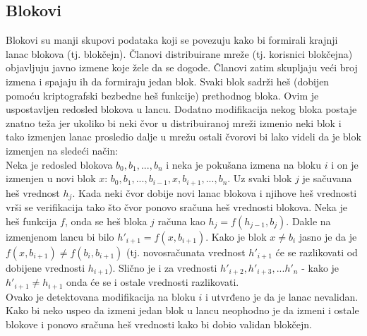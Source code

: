 \documentclass[a4paper]{article}
\begin{document}
{\subsection{Blokovi}
Blokovi su manji skupovi podataka koji se povezuju kako bi formirali krajnji lanac blokova (tj. blokčejn).
Članovi distribuirane mreže (tj. korisnici blokčejna) objavljuju javno izmene koje žele da se dogode.
Članovi zatim skupljaju veći broj izmena i spajaju ih da formiraju jedan blok.
Svaki blok sadrži heš (dobijen pomoću kriptografski bezbedne heš funkcije) prethodnog bloka.
Ovim je uspostavljen redosled blokova u lancu. Dodatno modifikacija nekog bloka postaje znatno teža jer ukoliko
bi neki čvor u distribuiranoj mreži izmenio neki blok i tako izmenjen lanac prosledio dalje u mrežu
ostali čvorovi bi lako videli da je blok izmenjen na sledeći način:\\
Neka je redosled blokova $b_0,b_1,...,b_n$ i neka je pokušana izmena na bloku $i$ i on je izmenjen u novi blok $x$:
$b_0,b_1,...,b_{i-1},x,b_{i+1},...,b_n$.
Uz svaki blok $j$ je sačuvana heš vrednost $h_j$. Kada neki čvor dobije novi lanac blokova i njihove heš vrednosti vrši se verifikacija
tako što čvor ponovo sračuna heš vrednosti blokova. Neka je heš funkcija $f$, onda se heš bloka $j$ računa kao
$h_j = f(h_{j-1},b_j)$. Dakle na izmenjenom lancu bi bilo $h'_{i+1} = f(x,b_{i+1})$. Kako je blok $x \neq b_i$ jasno je
da je $f(x,b_{i+1}) \neq f(b_{i},b_{i+1})$ (tj. novosračunata vrednost $h'_{i+1}$ će se razlikovati od dobijene vrednosti $h_{i+1}$).
Slično je i za vrednosti $h'_{i+2},h'_{i+3},...h'_{n}$ - kako je $h'_{i+1} \neq h_{i+1}$ onda će se i ostale vrednosti razlikovati.\\
Ovako je detektovana modifikacija na bloku $i$ i utvrđeno je da je lanac nevalidan.
Kako bi neko uspeo da izmeni jedan blok u lancu neophodno je da izmeni i ostale blokove i ponovo sračuna
heš vrednosti kako bi dobio validan blokčejn. 

}
\end{document}
